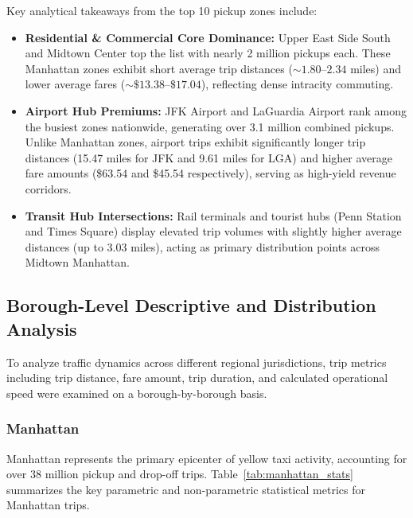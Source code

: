 \documentclass[11pt,a4paper]{article}
\begin{document}
Key analytical takeaways from the top 10 pickup zones include:
\begin{itemize}
    \item \textbf{Residential \& Commercial Core Dominance:} Upper East Side South and Midtown Center top the list with nearly 2 million pickups each. These Manhattan zones exhibit short average trip distances ($\sim 1.80$--$2.34$ miles) and lower average fares ($\sim \$13.38$--$\$17.04$), reflecting dense intracity commuting.
    \item \textbf{Airport Hub Premiums:} JFK Airport and LaGuardia Airport rank among the busiest zones nationwide, generating over 3.1 million combined pickups. Unlike Manhattan zones, airport trips exhibit significantly longer trip distances (15.47 miles for JFK and 9.61 miles for LGA) and higher average fare amounts (\$63.54 and \$45.54 respectively), serving as high-yield revenue corridors.
    \item \textbf{Transit Hub Intersections:} Rail terminals and tourist hubs (Penn Station and Times Square) display elevated trip volumes with slightly higher average distances (up to 3.03 miles), acting as primary distribution points across Midtown Manhattan.
\end{itemize}

\subsection{Borough-Level Descriptive and Distribution Analysis}

To analyze traffic dynamics across different regional jurisdictions, trip metrics including trip distance, fare amount, trip duration, and calculated operational speed were examined on a borough-by-borough basis.

\subsubsection{Manhattan}
Manhattan represents the primary epicenter of yellow taxi activity, accounting for over $38\text{ million}$ pickup and drop-off trips. Table~\ref{tab:manhattan_stats} summarizes the key parametric and non-parametric statistical metrics for Manhattan trips.
\end{document}
